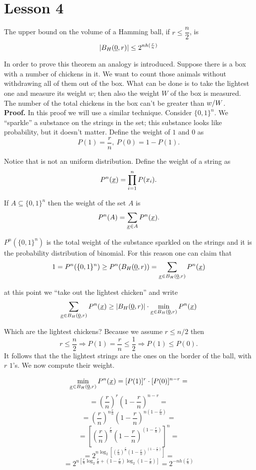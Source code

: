 \section{Lesson 4}

\begin{thm}
	The upper bound on the volume of a Hamming ball, if $ r \leq \dfrac{n}{2}$, is
	$$|B_H(\underline{0}, r)| \leq 2^{nh(\frac{r}{n})}$$
\end{thm}

In order to prove this theorem an analogy is introduced. Suppose there is a box with a number of chickens in it. We want to count those animals without withdrawing all of them out of the box. What can be done is to take the lightest one and measure its weight $w$; then also the weight $W$ of the box is measured. The number of the total chickens in the box can't be greater than ${w}/{W}$.\\

\noindent\textbf{Proof.} In this proof we will use a similar technique. Consider $\{0, 1\}^n$. We ``sparkle'' a substance on the strings in the set; this substance looks like probability, but it doesn't matter. Define the weight of $1$ and $0$ as 
$$P(1) = \dfrac{r}{n},\ P(0) = 1 - P(1).$$

Notice that is not an uniform distribution. Define the weight of a string as
$$P^n(\underline{x}) = \prod_{i = 1}^n P(x_i).$$

If $A \subseteq \{0, 1\}^n$ then the weight of the set $A$ is $$P^n(A) = \sum_{\underline{x} \in A} P^n(\underline{x}).$$

$P^n(\{0, 1\}^n)$ is the total weight of the substance sparkled on the strings and it is the probability distribution of binomial. For this reason one can claim that
$$1 = P^n(\{0, 1\}^n) \geq P^n(B_H(\underline{0}, r)) = \sum_{\underline{x} \in B_H(\underline{0}, r)} P^n(\underline{x})$$

at this point we ``take out the lightest chicken'' and write
$$\sum_{\underline{x} \in B_H(\underline{0}, r)} P^n(\underline{x}) \geq |B_H(\underline{0}, r)| \cdot \min_{\underline{x} \in B_H(\underline{0}, r)}P^n(\underline{x})$$

Which are the lightest chickens? Because we assume $r \leq n/2$ then
$$r \leq \dfrac{n}{2} \Rightarrow P(1) = \dfrac{r}{n} \leq \dfrac{1}{2} \Rightarrow P(1) \leq P(0).$$
It follows that the the lightest strings are the ones on the border of the ball, with $r$ $1$'s. We now compute their weight.

\[\min_{\underline{x} \in B_H(\underline{0}, r)}P^n(\underline{x}) = [P(1)]^r\cdot[P(0)]^{n-r} = \] 
\[ = \left(\dfrac{r}{n}\right)^r \left(1 - \dfrac{r}{n}\right)^{n-r} = \]  \[ = \left(\dfrac{r}{n}\right)^{n\frac{r}{n}} \left(1 - \dfrac{r}{n}\right)^{n\left(1 - \frac{r}{n}\right)} =\]
\[ = [\left(\dfrac{r}{n}\right)^{\frac{r}{n}} \left(1 - \dfrac{r}{n}\right)^{\left(1 - \frac{r}{n}\right)}]^n =\] 
\[ =2^{n\log_2[\left(\frac{r}{n}\right)^{\frac{r}{n}}  \left(1 - \frac{r}{n}\right)^{\left(1 - \frac{r}{n}\right)}]} = \]
\[ =2^{n[\frac{r}{n}\log_2\frac{r}{n} + \left(1 - \frac{r}{n}\right)\log_2\left(1 - \frac{r}{n}\right)]} = 2^{-nh(\frac{r}{n})}\]

